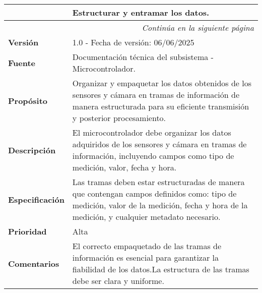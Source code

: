\begin{longtable}{|l|p{}|}
\hline
\textbf{} & \textbf{Estructurar y entramar los datos.} \\
\hline
\endfirsthead
\multicolumn{2}{r}{\textit{Continúa en la siguiente página}} \\
\endfoot
\endlastfoot
\textbf{Versión} & 1.0 - Fecha de versión: 06/06/2025 \\ \hline
\textbf{Fuente} & Documentación técnica del subsistema - Microcontrolador.\\ \hline
\textbf{Propósito} & Organizar y empaquetar los datos obtenidos de los sensores y cámara en tramas de información de manera estructurada para su eficiente transmisión y posterior procesamiento.\\ \hline
\textbf{Descripción} & El microcontrolador debe organizar los datos adquiridos de los sensores y cámara en tramas de información, incluyendo campos como tipo de medición, valor, fecha y hora.\\ \hline
\textbf{Especificación} & Las tramas deben estar estructuradas de manera que contengan campos definidos como: tipo de medición, valor de la medición, fecha y hora de la medición, y cualquier metadato necesario.\\ \hline
\textbf{Prioridad} & Alta \\ \hline
\textbf{Comentarios} & El correcto empaquetado de las tramas de información es esencial para garantizar la fiabilidad de los datos.La estructura de las tramas debe ser clara y uniforme.\\ \hline
\end{longtable}

